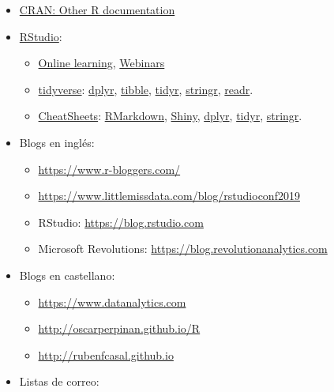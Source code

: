 \documentclass[]{book}
\theoremstyle{definition}
\theoremstyle{definition}
\theoremstyle{definition}
\theoremstyle{remark}
\begin{document}
\begin{itemize}
\item
  \href{https://www.r-project.org/other-docs.html}{CRAN: Other R
  documentation}
\item
  \href{https://www.rstudio.com}{RStudio}:

  \begin{itemize}
  \item
    \href{https://www.rstudio.com/online-learning}{Online learning},
    \href{https://resources.rstudio.com/webinars}{Webinars}
  \item
    \href{https://www.tidyverse.org/}{tidyverse}:
    \href{https://dplyr.tidyverse.org}{dplyr},
    \href{https://tibble.tidyverse.org}{tibble},
    \href{https://tidyr.tidyverse.org}{tidyr},
    \href{https://stringr.tidyverse.org}{stringr},
    \href{https://readr.tidyverse.org}{readr}.
  \item
    \href{https://resources.rstudio.com/rstudio-cheatsheets}{CheatSheets}:
    \href{https://resources.rstudio.com/rstudio-cheatsheets/rmarkdown-2-0-cheat-sheet}{RMarkdown},
    \href{https://resources.rstudio.com/rstudio-cheatsheets/shiny-cheat-sheet}{Shiny},
    \href{https://github.com/rstudio/cheatsheets/blob/master/data-transformation.pdf}{dplyr},
    \href{https://github.com/rstudio/cheatsheets/blob/master/data-import.pdf}{tidyr},
    \href{https://resources.rstudio.com/rstudio-cheatsheets/stringr-cheat-sheet}{stringr}.
  \end{itemize}
\item
  Blogs en inglés:

  \begin{itemize}
  \item
    \url{https://www.r-bloggers.com/}
  \item
    \url{https://www.littlemissdata.com/blog/rstudioconf2019}
  \item
    RStudio: \url{https://blog.rstudio.com}
  \item
    Microsoft Revolutions: \url{https://blog.revolutionanalytics.com}
  \end{itemize}
\item
  Blogs en castellano:

  \begin{itemize}
  \item
    \url{https://www.datanalytics.com}
  \item
    \url{http://oscarperpinan.github.io/R}
  \item
    \url{http://rubenfcasal.github.io}
  \end{itemize}
\item
  Listas de correo:


\end{itemize}
\end{document}
